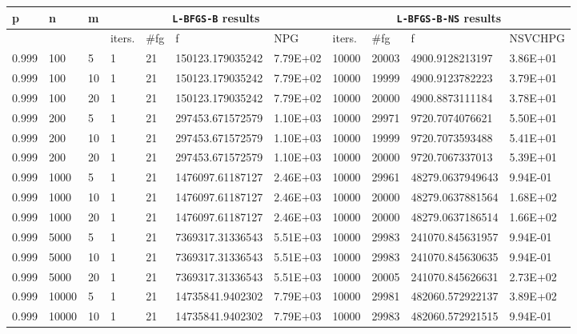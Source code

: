 \begin{table}
  \tiny
  \begin{center}
    \begin{tabular}{|l|l|l|l|l|l|l|l|l|l|l|}
      \hline
      p  & n & m  & \multicolumn{4}{|c|}{\texttt{L-BFGS-B} results} & \multicolumn{4}{|c|}{\texttt{L-BFGS-B-NS} results} \\ \hline
      &  &  & iters. & \#fg & f & NPG & iters. & \#fg & f & NSVCHPG \\ \hline
      0.999 & 100 & 5 & 1 & 21 & 150123.179035242 & 7.79E+02 & 10000 & 20003 & 4900.9128213197 & 3.86E+01\\
      0.999 & 100 & 10 & 1 & 21 & 150123.179035242 & 7.79E+02 & 10000 & 19999 & 4900.9123782223 & 3.79E+01\\
      0.999 & 100 & 20 & 1 & 21 & 150123.179035242 & 7.79E+02 & 10000 & 20000 & 4900.8873111184 & 3.78E+01\\
      0.999 & 200 & 5 & 1 & 21 & 297453.671572579 & 1.10E+03 & 10000 & 29971 & 9720.7074076621 & 5.50E+01\\
      0.999 & 200 & 10 & 1 & 21 & 297453.671572579 & 1.10E+03 & 10000 & 19999 & 9720.7073593488 & 5.41E+01\\
      0.999 & 200 & 20 & 1 & 21 & 297453.671572579 & 1.10E+03 & 10000 & 20000 & 9720.7067337013 & 5.39E+01\\
      0.999 & 1000 & 5 & 1 & 21 & 1476097.61187127 & 2.46E+03 & 10000 & 29961 & 48279.0637949643 & 9.94E-01\\
      0.999 & 1000 & 10 & 1 & 21 & 1476097.61187127 & 2.46E+03 & 10000 & 20000 & 48279.0637881564 & 1.68E+02\\
      0.999 & 1000 & 20 & 1 & 21 & 1476097.61187127 & 2.46E+03 & 10000 & 20000 & 48279.0637186514 & 1.66E+02\\
      0.999 & 5000 & 5 & 1 & 21 & 7369317.31336543 & 5.51E+03 & 10000 & 29983 & 241070.845631957 & 9.94E-01\\
      0.999 & 5000 & 10 & 1 & 21 & 7369317.31336543 & 5.51E+03 & 10000 & 29983 & 241070.845630635 & 9.94E-01\\
      0.999 & 5000 & 20 & 1 & 21 & 7369317.31336543 & 5.51E+03 & 10000 & 20005 & 241070.845626631 & 2.73E+02\\
      0.999 & 10000 & 5 & 1 & 21 & 14735841.9402302 & 7.79E+03 & 10000 & 29981 & 482060.572922137 & 3.89E+02\\
      0.999 & 10000 & 10 & 1 & 21 & 14735841.9402302 & 7.79E+03 & 10000 & 29983 & 482060.572921515 & 9.94E-01\\

\end{tabular}
\end{center}
\end{table}
